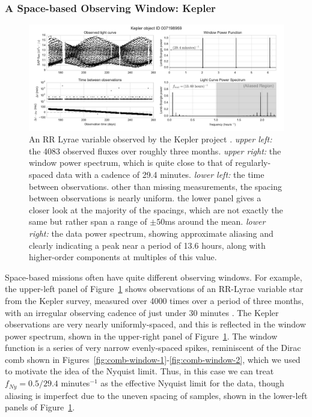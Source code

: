 \documentclass[preprint]{aastex}
\newcommand{\fig}[1]{Figure~\ref{fig:#1}}
\newcommand{\figs}[2]{Figures~\ref{fig:#1}-\ref{fig:#2}}
\newcommand{\figlabel}[1]{\label{fig:#1}}
\begin{document}
\subsubsection{A Space-based Observing Window: Kepler}

\begin{figure}[ht]
  \centering
  \includegraphics[width=\textwidth]{fig16_kepler_data}
  \caption{An RR Lyrae variable observed by the Kepler project \citep[see][]{Kolenberg2010}.
    {\it upper left:} the 4083 observed fluxes over roughly three months.
    {\it upper right:} the window power spectrum, which is quite close to that of regularly-spaced data with a cadence of 29.4 minutes.
    {\it lower left:} the time between observations. other than missing measurements, the spacing between observations is nearly uniform. the lower panel gives a closer look at the majority of the spacings, which are not exactly the same but rather span a range of $\pm 50$ms around the mean.
    {\it lower right:} the data power spectrum, showing approximate aliasing and clearly indicating a peak near a period of 13.6 hours, along with higher-order components at multiples of this value.
    \figlabel{kepler-data}}
\end{figure}

Space-based missions often have quite different observing windows.
For example, the upper-left panel of \fig{kepler-data}
shows observations of an RR-Lyrae variable star from the Kepler survey,
measured over 4000 times over a period of three months,
with an irregular observing cadence of just under 30 minutes
 \citep[For deeper discussion of these observations, see][]{Kolenberg2010}.
The Kepler observations are very nearly uniformly-spaced, and this is reflected
in the window power spectrum, shown in the upper-right panel of
\fig{kepler-data}.
The window function is a series of very narrow evenly-spaced spikes,
reminiscent of the Dirac comb shown in \figs{comb-window-1}{comb-window-2},
which we used to motivate the idea of the Nyquist limit.
Thus, in this case we can treat $f_{Ny} = 0.5/29.4$ minutes$^{-1}$ as the
effective Nyquist limit for the data, though aliasing is imperfect due to
the uneven spacing of samples, shown in the lower-left panels of
\fig{kepler-data}.
\end{document}
